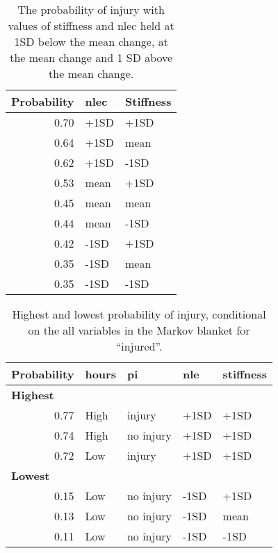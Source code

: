\documentclass[
]{frontiersHLTH}
\begin{document}
\begin{table}[H]

\caption{\label{tab:table11}The probability of injury with values of stiffness and nlec held at 1SD below the mean change, at the mean change and 1 SD above the mean change.}
\centering
\begin{tabular}[t]{r|l|l}
\hline
\textbf{Probability} & \textbf{nlec} & \textbf{Stiffness}\\
\hline
0.70 & +1SD & +1SD\\
\hline
0.64 & +1SD & mean\\
\hline
0.62 & +1SD & -1SD\\
\hline
0.53 & mean & +1SD\\
\hline
0.45 & mean & mean\\
\hline
0.44 & mean & -1SD\\
\hline
0.42 & -1SD & +1SD\\
\hline
0.35 & -1SD & mean\\
\hline
0.35 & -1SD & -1SD\\
\hline
\end{tabular}
\end{table}

\begin{table}[H]

\caption{\label{tab:table12}Highest and lowest probability of injury, conditional on the all variables in the Markov blanket for ``injured''.}
\centering
\begin{tabular}[t]{r|l|l|l|l}
\hline
\textbf{Probability} & \textbf{hours} & \textbf{pi} & \textbf{nle} & \textbf{stiffness}\\
\hline
\multicolumn{5}{l}{\textbf{Highest}}\\
\hline
\hspace{1em}0.77 & High & injury & +1SD & +1SD\\
\hline
\hspace{1em}0.74 & High & no injury & +1SD & +1SD\\
\hline
\hspace{1em}0.72 & Low & injury & +1SD & +1SD\\
\hline
\multicolumn{5}{l}{\textbf{Lowest}}\\
\hline
\hspace{1em}0.15 & Low & no injury & -1SD & +1SD\\
\hline
\hspace{1em}0.13 & Low & no injury & -1SD & mean\\
\hline
\hspace{1em}0.11 & Low & no injury & -1SD & -1SD\\
\hline
\end{tabular}
\end{table}
\end{document}
